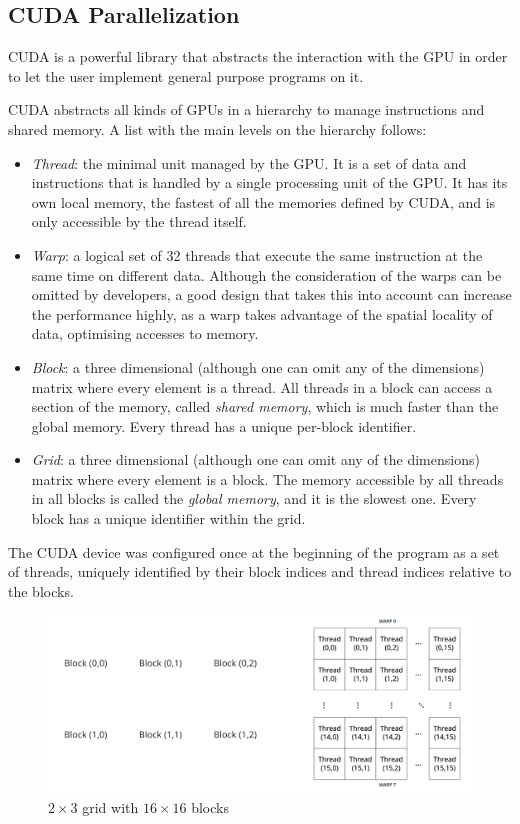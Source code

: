 \subsection{CUDA Parallelization}
\label{sec:cuda}

\ac{CUDA} is a powerful library that abstracts the interaction with the \ac{GPU} in order to let the user implement general purpose programs on it.

\ac{CUDA} abstracts all kinds of \acp{GPU} in a hierarchy to manage instructions and shared memory. A list with the main levels on the hierarchy follows:
\begin{itemize}
	\item \emph{Thread}: the minimal unit managed by the \ac{GPU}. It is a set of data and instructions that is handled by a single processing unit of the \ac{GPU}. It has its own local memory, the fastest of all the memories defined by \ac{CUDA}, and is only accessible by the thread itself.
	\item \emph{Warp}: a logical set of 32 threads that execute the same instruction at the same time on different data. Although the consideration of the warps can be omitted by developers, a good design that takes this into account can increase the performance highly, as a warp takes advantage of the spatial locality of data, optimising accesses to memory.
	\item \emph{Block}: a three dimensional (although one can omit any of the dimensions) matrix where every element is a thread. All threads in a block can access a section of the memory, called \emph{shared memory}, which is much faster than the global memory. Every thread has a unique per-block identifier.
	\item \emph{Grid}: a three dimensional (although one can omit any of the dimensions) matrix where every element is a block. The memory accessible by all threads in all blocks is called the \emph{global memory}, and it is the slowest one. Every block has a unique identifier within the grid.
\end{itemize}

The \ac{CUDA} device was configured once at the beginning of the program as a set of threads, uniquely identified by their block indices and thread indices relative to the blocks.

\begin{figure}[bth]
	\myfloatalign
	\includegraphics[width=.8\linewidth]{gfx/cudagrid}
	\caption[$2\times3$ grid with $16\times16$ blocks]{$2\times3$ grid with $16\times16$ blocks}
	\label{fig:cudagrid}
\end{figure}

